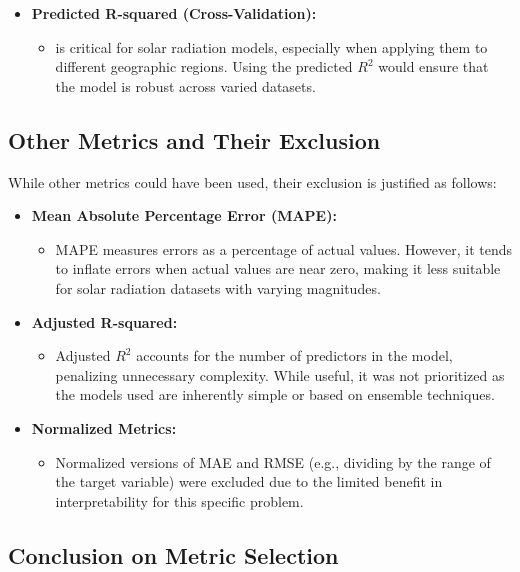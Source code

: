 \documentclass[10pt,twocolumn]{article}
\begin{document}
\begin{itemize}
\begin{itemize}
    \item \textbf{Predicted R-squared (Cross-Validation):}
    \begin{itemize}
        \item \Generalizability is critical for solar radiation models, especially when applying them to different geographic regions. Using the predicted \( R^2 \) would ensure that the model is robust across varied datasets.
    \end{itemize}
\end{itemize}

\subsection*{Other Metrics and Their Exclusion}

While other metrics could have been used, their exclusion is justified as follows:
\begin{itemize}
    \item \textbf{Mean Absolute Percentage Error (MAPE):}
    \begin{itemize}
        \item MAPE measures errors as a percentage of actual values. However, it tends to inflate errors when actual values are near zero, making it less suitable for solar radiation datasets with varying magnitudes.
    \end{itemize}

    \item \textbf{Adjusted R-squared:}
    \begin{itemize}
        \item Adjusted \( R^2 \) accounts for the number of predictors in the model, penalizing unnecessary complexity. While useful, it was not prioritized as the models used are inherently simple or based on ensemble techniques.
    \end{itemize}

    \item \textbf{Normalized Metrics:}
    \begin{itemize}
        \item Normalized versions of MAE and RMSE (e.g., dividing by the range of the target variable) were excluded due to the limited benefit in interpretability for this specific problem.
    \end{itemize}
\end{itemize}

\subsection*{Conclusion on Metric Selection}


\end{itemize}
\end{document}
